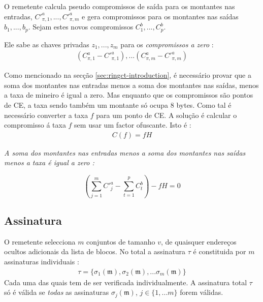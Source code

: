 O remetente calcula pseudo compromissos de saída para os montantes nas entradas,
$C'^a_{\pi,1}, ..., C'^a_{\pi,m}$ e gera compromissos para os montantes nas saídas $b_1, ..., b_{p}$. Sejam estes novos compromissos $C^b_1, ..., C^b_{p}$.


Ele sabe as chaves privadas $z_1,...,z_m$ para os {\em compromissos a zero} :
\begin{align*}
(C^a_{\pi,1} - C'^a_{\pi,1}),...(C^a_{\pi,m} - C'^a_{\pi,m})  
\end{align*}


Como mencionado na secção \ref{sec:ringct-introduction}, é necessário provar que a soma dos montantes nas entradas menos a soma dos montantes nas saídas, menos a taxa de mineiro é igual a zero. Mas enquanto que os compromissos são pontos de CE, a taxa sendo também um montante só ocupa 8 bytes. Como tal é necessário converter a taxa $f$ para um ponto de CE. A solução é calcular o compromisso á taxa $f$ sem usar um factor ofuscante. Isto é :
\begin{align*}
C(f) = f H
\end{align*}

{\em
A soma dos montantes nas entradas menos a soma dos montantes nas saídas menos a taxa é igual a zero :
}

\[(\sum_{j=1}^m C'^a_{j} - \sum_{t=1}^p C^b_{t}) - f H = 0\]


\subsection{Assinatura}
\label{full-signature}

O remetente selecciona $m$ conjuntos de tamanho $v$, de quaisquer endereços ocultos adicionais da lista de blocos. No total a assinatura $\tau$ é constituida por $m$ assinaturas individuais :
\begin{align*}
    \tau = \{\sigma_1(\mathfrak{m}), \sigma_2(\mathfrak{m}), ... \sigma_m(\mathfrak{m})\} 
\end{align*}
Cada uma das quais tem de ser verificada individualmente. A assinatura total $\tau$ só é válida se {\em todas} as assinaturas $\sigma_j(\mathfrak{m})$, $j\in\{1,...m\}$ forem válidas.   

